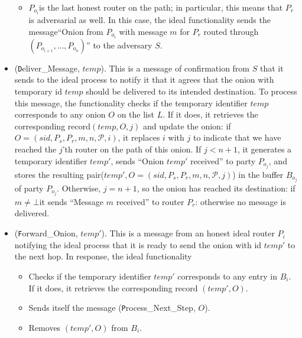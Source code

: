 \begin{itemize}
{\begin{enumerate}
{\begin{itemize}
    \item{ \(P_{o_i}\)is the last honest router on the path; in
      particular, this means that \(P_r\) is adversarial as well. In
      this case, the ideal functionality sends the message``Onion from
      \(P_{o_i}\) with message \(m\) for \(P_r\) routed through
      \((P_{o_{i+1}}, \ldots,P_{o_n})\)'' to the adversary \(S\).}
    \end{itemize}
  }    
  \end{enumerate}
}

\item{({\texttt Deliver_Message}, \(temp\)). This is a message of
  confirmation from
  \(S\) that it sends to the ideal process to notify it that it agrees that
  the onion with temporary id \(temp\) should be delivered to its
  intended destination. To process this message, the functionality
  checks if the temporary identifier \(temp\) corresponds to any onion
  \(O\) on the list \(L\). If it does, it retrieves the corresponding
  record\((temp, O, j)\) and update the onion: if \(O= (sid, P_s, P_r,
  m, n, \mathcal{P}, i)\), it replaces \(i\) with \(j\) to indicate
  that we have reached the \(j\)'th router on the path of this
  onion. If \(j < n+ 1\), it generates a temporary identifier
  \(temp'\), sends ``Onion \(temp'\) received'' to party \(P_{o_j}\),
  and stores the resulting pair(\(temp', O= (sid, P_s, P_r, m, n,
  \mathcal{P}, j)\)) in the buffer \(B_{o_j}\) of party
  \(P_{o_j}\). Otherwise, \(j=n+ 1\), so the onion has reached its
  destination: if \(m \neq \bot\)it sends ``Message \(m\) received''
  to router \(P_r\): otherwise no message is delivered.
}

\item{({\texttt Forward_Onion}, \(temp'\)). This is a message from an
  honest ideal router \(P_i\) notifying the ideal process that it is
  ready to send the onion with id \(temp'\) to the next hop. In
  response, the ideal functionality
  
  \begin{itemize}
    
  \item{Checks if the temporary identifier \(temp'\) corresponds to
    any entry in \(B_i\). If it does, it retrieves the corresponding
    record \((temp', O)\).
  }

  \item{ Sends itself the message ({\texttt Process_Next_Step},
    \(O\)).
  }

  \item{ Removes \((temp', O)\) from \(B_i\).
  }
  \end{itemize}
}
\end{itemize}


